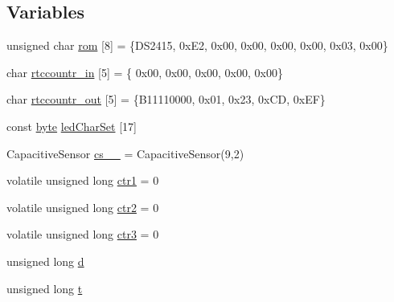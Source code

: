 \subsection*{Variables}
\begin{DoxyCompactItemize}
\item 
unsigned char \hyperlink{OWGeneric__DangerShield_8ino_a8beb78e2b3f2cb6e34f34861a875ca0b}{rom} \mbox{[}8\mbox{]} = \{D\-S2415, 0x\-E2, 0x00, 0x00, 0x00, 0x00, 0x03, 0x00\}
\item 
char \hyperlink{OWGeneric__DangerShield_8ino_a81a94fdcf5fd0721c26e50dd4cd32b1e}{rtccountr\-\_\-in} \mbox{[}5\mbox{]} = \{ 0x00, 0x00, 0x00, 0x00, 0x00\}
\item 
char \hyperlink{OWGeneric__DangerShield_8ino_ac150db4005f4bac8510f9e697f1c291a}{rtccountr\-\_\-out} \mbox{[}5\mbox{]} = \{B11110000, 0x01, 0x23, 0x\-C\-D, 0x\-E\-F\}
\item 
const \hyperlink{Arduino_8h_ab8ef12fab634c171394422d0ee8baf94}{byte} \hyperlink{OWGeneric__DangerShield_8ino_a9fd6363d57e3788ec90445fb8f7e46e6}{led\-Char\-Set} \mbox{[}17\mbox{]}
\item 
Capacitive\-Sensor \hyperlink{OWGeneric__DangerShield_8ino_af6f50cfb8376b0de0f518da1b7d1b2f8}{cs\-\_\-\_} = Capacitive\-Sensor(9,2)
\item 
volatile unsigned long \hyperlink{OWGeneric__DangerShield_8ino_a68c3f19187ae81a2c190ec87b5874dd3}{ctr1} = 0
\item 
volatile unsigned long \hyperlink{OWGeneric__DangerShield_8ino_ab93a6d1ba9d998ab5d4f846e8cea0149}{ctr2} = 0
\item 
volatile unsigned long \hyperlink{OWGeneric__DangerShield_8ino_a9edb10c1b079b5c8e77748ca203036eb}{ctr3} = 0
\item 
unsigned long \hyperlink{OWGeneric__DangerShield_8ino_a22871ee78191bcd7676a38358795104e}{d}
\item 
unsigned long \hyperlink{OWGeneric__DangerShield_8ino_a1ffe6f4d89de83b8119fa91af85fcacc}{t}
\end{DoxyCompactItemize}


